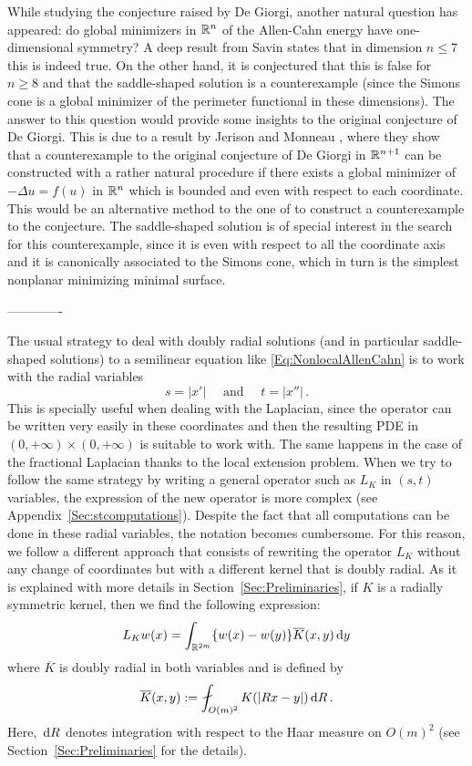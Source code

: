 While studying the conjecture raised by De Giorgi, another natural question has appeared: do global minimizers in $\mathbb{R}^n$ of the Allen-Cahn energy have one-dimensional symmetry? A deep result from Savin \cite{Savin-DeGiorgi} states that in dimension $n \leq 7$ this is indeed true. On the other hand, it is conjectured that this is false for $n\geq 8$ and that the saddle-shaped solution is a counterexample (since the Simons cone is a global minimizer of the perimeter functional in these dimensions). The answer to this question would provide some insights to the original conjecture of De Giorgi. This is due to a result by Jerison and Monneau \cite{JerisonMonneau}, where they show that a counterexample to the original conjecture of De Giorgi in $\mathbb{R}^{n+1}$ can be constructed with a rather natural procedure if there exists a global minimizer of $-\Delta u = f(u)$ in $\mathbb{R}^n$ which is bounded and even with respect to each coordinate. This would be an alternative method to the one of \cite{delPinoKowalczykWei} to construct a counterexample to the conjecture. The saddle-shaped solution is of special interest in the search for this counterexample, since it is even with respect to all the coordinate axis and it is canonically associated to the Simons cone, which in turn is the simplest nonplanar minimizing minimal surface.

\bigskip
\bigskip
\bigskip
-------------
\bigskip
\bigskip
\bigskip

The usual strategy to deal with doubly radial solutions (and in particular saddle-shaped solutions) to a semilinear equation like \eqref{Eq:NonlocalAllenCahn} is to work with the radial variables 
$$
s = |x'| \quad \text{ and } \quad t=|x''|\,.
$$
This is specially useful when dealing with the Laplacian, since the operator can be written very easily in these coordinates and then the resulting PDE in $(0,+\infty)\times (0,+\infty)$ is suitable to work with. The same happens in the case of the fractional Laplacian thanks to the local extension problem. When we try to follow the same strategy by writing a general operator such as $L_K$ in $(s,t)$ variables, the expression of the new operator is more complex (see Appendix~\ref{Sec:stcomputations}). Despite the fact that all computations can be done in these radial variables, the notation becomes cumbersome. For this reason, we follow a different approach that consists of rewriting the operator $L_K$ without any change of coordinates but with a different kernel that is doubly radial. As it is explained with more details in Section~\ref{Sec:Preliminaries}, if $K$ is a radially symmetric kernel, then we find the following expression:
$$
L_K w(x) = \int_{\mathbb{R}^{2m}} \{w(x) - w(y)\} \overline{K}(x,y) \,\mathrm{d} y
$$
where $\overline{K}$ is doubly radial in both variables and is defined by
\begin{equation}
\label{Eq:KbarDef'}
\overline{K}(x,y) := \average_{O(m)^2} K(|Rx - y|)\d R\,.
\end{equation}
Here, $\,\mathrm{d} R$ denotes integration with respect to the Haar measure on $O(m)^2$ (see Section~\ref{Sec:Preliminaries} for the details).


